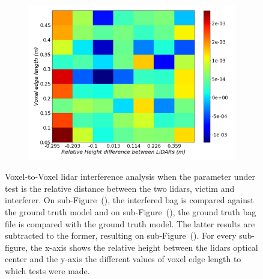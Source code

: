 \begin{figure}[!ht]
\begin{subfigure}[c]{0.45\textwidth}
	\label{fig:height:octree-ground-truth-color-mesh}
\end{subfigure}
\\ \vspace{4mm}
\begin{subfigure}[c]{0.6\textwidth}
	\includegraphics[width=\textwidth]{img/lidar-interference/height/octree_difference_color_mesh.png}
\caption{}%
	\label{fig:height:octree-difference-color-mesh}
\end{subfigure}

\caption[Voxel-to-Voxel analysis when the height between the \acp{lidar} is variated.]{Voxel-to-Voxel \ac{lidar} interference analysis when the parameter under test is the relative distance between the two \acp{lidar}, victim and interferer. On sub-Figure~(), the interfered bag is compared against the ground truth model and on sub-Figure~(), the ground truth bag file is compared with the ground truth model. The latter results are subtracted to the former, resulting on sub-Figure~(). For every sub-figure, the x-axis shows the relative height between the \acp{lidar} optical center and the y-axis the different values of voxel edge length to which tests were made.}
\label{fig:height:octree-color-mesh}
\end{figure}

